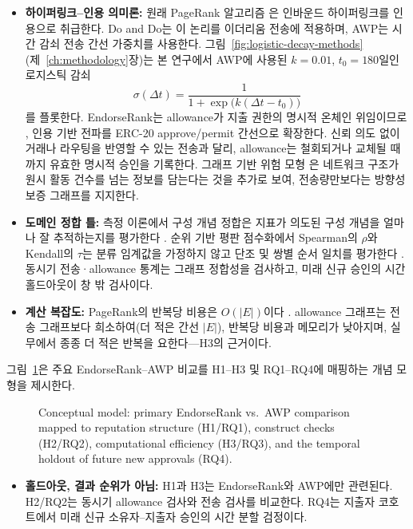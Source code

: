 \begin{itemize}
\item \textbf{하이퍼링크--인용 의미론:} 원래 PageRank 알고리즘 은 인바운드 하이퍼링크를 인용으로 취급한다. Do and Do는 이 논리를 이더리움 전송에 적용하며, AWP는 시간 감쇠 전송 간선 가중치를 사용한다. 그림~\ref{fig:logistic-decay-methods}(제~\ref{ch:methodology}장)는 본 연구에서 AWP에 사용된 $k=0.01$, $t_0=180$일인 로지스틱 감쇠
\begin{equation}
\sigma(\Delta t)=\frac{1}{1+\exp\bigl(k(\Delta t-t_0)\bigr)}
\label{eq:logistic}
\end{equation}
를 플롯한다. EndorseRank는 allowance가 지출 권한의 명시적 온체인 위임이므로 , 인용 기반 전파를 ERC-20 approve/permit 간선으로 확장한다. 신뢰 의도 없이 거래나 라우팅을 반영할 수 있는 전송과 달리, allowance는 철회되거나 교체될 때까지 유효한 명시적 승인을 기록한다. 그래프 기반 위험 모형 은 네트워크 구조가 원시 활동 건수를 넘는 정보를 담는다는 것을 추가로 보여, 전송량만보다는 방향성 보증 그래프를 지지한다.

\item \textbf{도메인 정합 틀:} 측정 이론에서 구성 개념 정합은 지표가 의도된 구성 개념을 얼마나 잘 추적하는지를 평가한다 . 순위 기반 평판 점수화에서 Spearman의 $\rho$와 Kendall의 $\tau$는 분류 임계값을 가정하지 않고 단조 및 쌍별 순서 일치를 평가한다 . 동시기 전송·allowance 통계는 그래프 정합성을 검사하고, 미래 신규 승인의 시간 홀드아웃이 창 밖 검사이다.

\item \textbf{계산 복잡도:} PageRank의 반복당 비용은 $O(|E|)$이다 . allowance 그래프는 전송 그래프보다 희소하여(더 적은 간선 $|E|$), 반복당 비용과 메모리가 낮아지며, 실무에서 종종 더 적은 반복을 요한다---H3의 근거이다.
\end{itemize}

그림~\ref{fig:conceptual-model}은 주요 EndorseRank--AWP 비교를 H1--H3 및 RQ1--RQ4에 매핑하는 개념 모형을 제시한다.

\begin{figure}[htbp]
\centering

\caption{Conceptual model: primary EndorseRank vs.\ AWP comparison mapped to reputation structure (H1/RQ1), construct checks (H2/RQ2), computational efficiency (H3/RQ3), and the temporal holdout of future new approvals (RQ4).}
\label{fig:conceptual-model}
\end{figure}

\begin{itemize}
\item \textbf{홀드아웃, 결과 순위가 아님:} H1과 H3는 EndorseRank와 AWP에만 관련된다. H2/RQ2는 동시기 allowance 검사와 전송 검사를 비교한다. RQ4는 지출자 코호트에서 미래 신규 소유자--지출자 승인의 시간 분할 검정이다.
\end{itemize}

